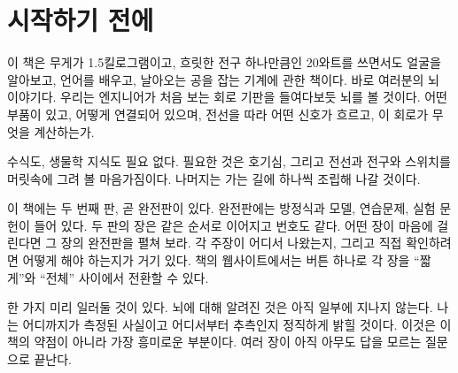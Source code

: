 \chapter*{시작하기 전에}

이 책은 무게가 1.5킬로그램이고, 흐릿한 전구 하나만큼인 20와트를 쓰면서도 얼굴을 알아보고, 언어를 배우고, 날아오는 공을 잡는 기계에 관한 책이다. 바로 여러분의 뇌 이야기다. 우리는 엔지니어가 처음 보는 회로 기판을 들여다보듯 뇌를 볼 것이다. 어떤 부품이 있고, 어떻게 연결되어 있으며, 전선을 따라 어떤 신호가 흐르고, 이 회로가 무엇을 계산하는가.

수식도, 생물학 지식도 필요 없다. 필요한 것은 호기심, 그리고 전선과 전구와 스위치를 머릿속에 그려 볼 마음가짐이다. 나머지는 가는 길에 하나씩 조립해 나갈 것이다.

이 책에는 두 번째 판, 곧 완전판이 있다. 완전판에는 방정식과 모델, 연습문제, 실험 문헌이 들어 있다. 두 판의 장은 같은 순서로 이어지고 번호도 같다. 어떤 장이 마음에 걸린다면 그 장의 완전판을 펼쳐 보라. 각 주장이 어디서 나왔는지, 그리고 직접 확인하려면 어떻게 해야 하는지가 거기 있다. 책의 웹사이트에서는 버튼 하나로 각 장을 “짧게”와 “전체” 사이에서 전환할 수 있다.

한 가지 미리 일러둘 것이 있다. 뇌에 대해 알려진 것은 아직 일부에 지나지 않는다. 나는 어디까지가 측정된 사실이고 어디서부터 추측인지 정직하게 밝힐 것이다. 이것은 이 책의 약점이 아니라 가장 흥미로운 부분이다. 여러 장이 아직 아무도 답을 모르는 질문으로 끝난다.
